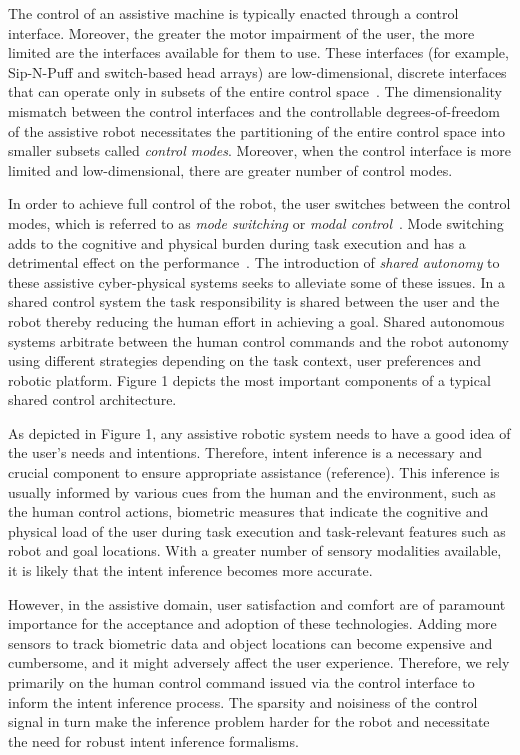The control of an assistive machine is typically enacted through a control interface. Moreover, the greater the motor impairment of the user, the more limited are the interfaces available for them to use. These interfaces (for example, Sip-N-Puff and switch-based head arrays) are low-dimensional, discrete interfaces that can operate only in subsets of the entire control space~\cite{simpson2008tooth, nuttin2002selection}. 
The dimensionality mismatch between the control interfaces and the controllable degrees-of-freedom of the assistive robot necessitates the partitioning of the entire control space into smaller subsets called \textit{control modes}. Moreover, when the control interface is more limited and low-dimensional, there are greater number of control modes. 

In order to achieve full control of the robot, the user switches between the control modes, which is referred to as \textit{mode switching} or \textit{modal control}~\cite{herlant2016assistive}. Mode switching adds to the cognitive and physical burden during task execution and has a detrimental effect on the performance~\cite{eftring1999technical}. The introduction of \textit{shared autonomy} to these assistive cyber-physical systems seeks to alleviate some of these issues. In a shared control system the task responsibility is shared between the user and the robot thereby reducing the human effort in achieving a goal. Shared autonomous systems arbitrate between the human control commands and the robot autonomy using different strategies depending on the task context, user preferences and robotic platform. Figure 1 depicts the most important components of a  typical shared control architecture.

As depicted in Figure 1, any assistive robotic system needs to have a good idea of the user's needs and intentions. Therefore, intent inference is a necessary and crucial component to ensure appropriate assistance (reference). This inference is usually informed by various cues from the human and the environment, such as the human control actions, biometric measures that indicate the cognitive and physical load of the user during task execution and task-relevant features such as robot and goal locations. With a greater number of sensory modalities available, it is likely that the intent inference becomes more accurate. 

However, in the assistive domain, user satisfaction and comfort are of paramount importance for the acceptance and adoption of these technologies. Adding more sensors to track biometric data and object locations can become expensive and cumbersome, and it might adversely affect the user experience. Therefore, we rely primarily on the human control command issued via the control interface to inform the intent inference process. The sparsity and noisiness of the control signal in turn make the inference problem harder for the robot and necessitate the need for robust intent inference formalisms. 

